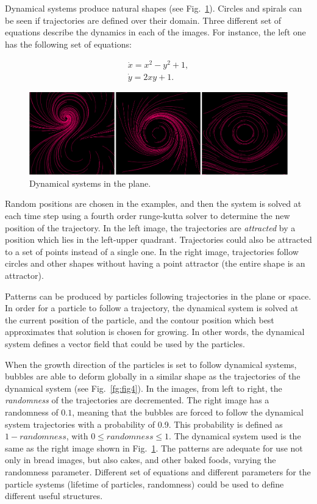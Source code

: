 \documentclass[oneside,a4paper,english,links]{amca}
\begin{document}
Dynamical systems produce natural shapes (see
Fig.~\ref{fg:fig3}). Circles and spirals can be seen if trajectories
are defined over their domain. Three different set of equations
describe the dynamics in each of the images. For instance, the left
one has the following set of equations:

\begin{equation} \label{eq:simple}  
  \begin{aligned}
    \dot{x} = x^{2}-y^{2}+1,\\
    \dot{y} = 2xy+1.
  \end{aligned}
\end{equation}


\begin{figure}[htb!]
  \centerline{\includegraphics[scale=0.28]{fig3}}
  \caption{Dynamical systems in the plane.}
  \label{fg:fig3}
\end{figure}


Random positions are chosen in the examples, and then the system is solved at each time step using a fourth order runge-kutta solver to determine the new position of the trajectory. In the left image, the trajectories are {\em attracted} by a position which lies in the left-upper quadrant. Trajectories could also be attracted to a set of points instead of a single one. In the right image, trajectories follow circles and other shapes without having a point attractor (the entire shape is an attractor).

Patterns can be produced by particles following trajectories in the plane or space. In order for a particle to follow a trajectory, the dynamical system is solved at the current position of the particle, and the contour position which best approximates that solution is chosen for growing. In other words, the dynamical system defines a vector field that could be used by the particles.

When the growth direction of the particles is set to follow dynamical
systems, bubbles are able to deform globally in a similar shape as the
trajectories of the dynamical system (see Fig.~\ref{fg:fig4}). In the
images, from left to right, the {\em randomness} of the trajectories
are decremented. The right image has a randomness of $0.1$, meaning
that the bubbles are forced to follow the dynamical system
trajectories with a probability of 0.9. This probability is defined as
$1-randomness$, with $0 \leq randomness \leq 1$. The dynamical system
used is the same as the right image shown in Fig.~\ref{fg:fig3}.  The
patterns are adequate for use not only in bread images, but also
cakes, and other baked foods, varying the randomness
parameter. Different set of equations and different parameters for the
particle systems (lifetime of particles, randomness) could be used to
define different useful structures.
\end{document}
